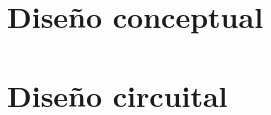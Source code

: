 \section{Diseño conceptual}
\resetallcounters

\clearpage


\section{Diseño circuital}
\resetallcounters

\clearpage


